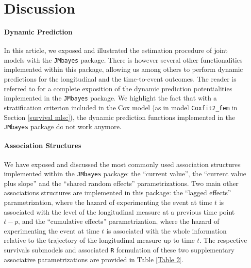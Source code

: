 \documentclass[12pt]{article}
\begin{document}
\section{Discussion}
\label{discussion}

\paragraph{Dynamic Prediction}
In this article, we exposed and illustrated the estimation procedure of joint models with the \texttt{JMbayes} package. There is however several other functionalities implemented within this package, allowing us among others to perform dynamic predictions for the longitudinal and the time-to-event outcomes. The reader is referred to \cite{JMbayes} for a complete exposition of the dynamic prediction potentialities implemented in the \texttt{JMbayes} package. We highlight the fact that with a stratification criterion included in the Cox model (as in model \texttt{Coxfit2\_fem} in Section \ref{survival mlsc}), the dynamic prediction functions implemented in the \texttt{JMbayes} package do not work anymore.

\paragraph{Association Structures}
We have exposed and discussed the most commonly used association structures implemented within the \texttt{JMbayes} package: the ``current value'', the ``current value plus slope'' and the ``shared random effects'' parametrizations. Two main other associations structures are implemented in this package: the ``lagged effects'' parametrization, where the hazard of experimenting the event at time $t$ is associated with the level of the longitudinal measure at a previous time point $t-p$, and the ``cumulative effects'' parametrization, where the hazard of experimenting the event at time $t$ is associated with the whole information relative to the trajectory of the longitudinal measure up to time $t$. The respective survivals submodels and associated \texttt{R} formulation of these two supplementary associative parametrizations are provided in Table \ref{Table 2}.  
\end{document}
